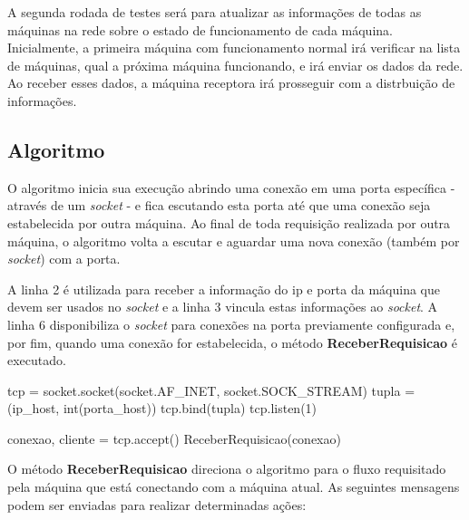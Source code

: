 A segunda rodada de testes será para atualizar as informações de todas as máquinas na rede sobre o estado de funcionamento de cada máquina. Inicialmente, a primeira máquina com funcionamento normal 
irá verificar na lista de máquinas, qual a próxima máquina funcionando, e irá enviar os dados da rede. Ao receber esses dados, a máquina receptora irá prosseguir com a distrbuição 
de informações.

\subsection{Algoritmo}
\label{sub:adaptiveDSD_Algoritmo}
O algoritmo \adaptive{} inicia sua execução abrindo uma conexão em uma porta específica - através de um \textit{socket} - e fica escutando esta porta até que uma conexão seja estabelecida por outra máquina.
Ao final de toda requisição realizada por outra máquina, o algoritmo volta a escutar e aguardar uma nova conexão (também por \textit{socket}) com a porta.

A linha 2 é utilizada para receber a informação do ip e porta da máquina que devem ser usados no \textit{socket} e a linha 3 vincula estas informações ao \textit{socket}. A linha 6 disponibiliza o \textit{socket} para conexões na porta previamente
configurada e, por fim, quando uma conexão for estabelecida, o método \textbf{ReceberRequisicao} é executado.

\vspace*{1cm}
\begin{python}
    tcp = socket.socket(socket.AF_INET, socket.SOCK_STREAM)
    tupla = (ip_host, int(porta_host))
    tcp.bind(tupla)
    tcp.listen(1)

    conexao, cliente = tcp.accept() 
    ReceberRequisicao(conexao)
\end{python}
\vspace*{1cm}

O método \textbf{ReceberRequisicao} direciona o algoritmo para o fluxo requisitado pela máquina que está conectando com a máquina atual. As seguintes mensagens podem ser enviadas para realizar determinadas ações:

